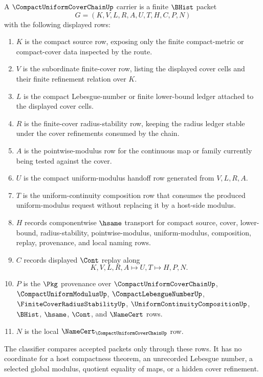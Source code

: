\begin{definition}
\label{def:compact-uniform-cover-chain-carrier}
A $\CompactUniformCoverChainUp$ carrier is a finite $\BHist$ packet
$$
G=(K,V,L,R,A,U,T,H,C,P,N)
$$
with the following displayed rows:
\begin{enumerate}
\item $K$ is the compact source row, exposing only the finite compact-metric or compact-cover data inspected by the route.
\item $V$ is the subordinate finite-cover row, listing the displayed cover cells and their finite refinement relation over $K$.
\item $L$ is the compact Lebesgue-number or finite lower-bound ledger attached to the displayed cover cells.
\item $R$ is the finite-cover radius-stability row, keeping the radius ledger stable under the cover refinements consumed by the chain.
\item $A$ is the pointwise-modulus row for the continuous map or family currently being tested against the cover.
\item $U$ is the compact uniform-modulus handoff row generated from $V,L,R,A$.
\item $T$ is the uniform-continuity composition row that consumes the produced uniform-modulus request without replacing it by a host-side modulus.
\item $H$ records componentwise $\hsame$ transport for compact source, cover, lower-bound, radius-stability, pointwise-modulus, uniform-modulus, composition, replay, provenance, and local naming rows.
\item $C$ records displayed $\Cont$ replay along
$$
K,V,L,R,A \longmapsto U,T \longmapsto H,P,N .
$$
\item $P$ is the $\Pkg$ provenance over $\CompactUniformCoverChainUp$, $\CompactUniformModulusUp$, $\CompactLebesgueNumberUp$, $\FiniteCoverRadiusStabilityUp$, $\UniformContinuityCompositionUp$, $\BHist$, $\hsame$, $\Cont$, and $\NameCert$ rows.
\item $N$ is the local $\NameCert_{\CompactUniformCoverChainUp}$ row.
\end{enumerate}
The classifier compares accepted packets only through these rows. It has no coordinate for a host compactness theorem, an unrecorded Lebesgue number, a selected global modulus, quotient equality of maps, or a hidden cover refinement.
\end{definition}

